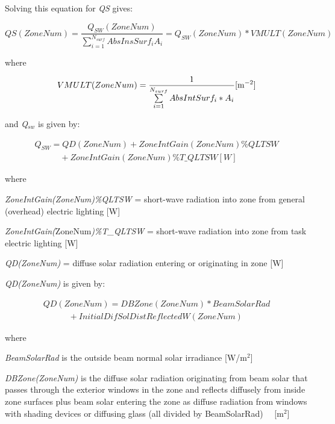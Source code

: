 Solving this equation for \emph{QS} gives:

\begin{equation}
QS(ZoneNum) = \frac{{{Q_{SW}}(ZoneNum)}}{{\sum\limits_{i = 1}^{{N_{surf}}} {AbsInsSur{f_i}{A_i}} }} = {Q_{SW}}(ZoneNum)*VMULT(ZoneNum)
\end{equation}

where

\begin{equation}
VMULT(ZoneNum) = \frac{1}{{\sum\limits_{i = 1}^{{N_{surf}}} {AbsIntSur{f_i}*{A_i}} }}{\rm{    [}}{{\rm{m}}^{{\rm{ - 2}}}}]
\end{equation}

and \emph{Q\(_{sw}\)} is given by:

\begin{equation}
\begin{array}{l}
{Q_{SW}} = QD(ZoneNum) + ZoneIntGain(ZoneNum)\% QLTSW \\
\quad \quad \quad + ZoneIntGain(ZoneNum)\% T\_QLTSW [W]
\end{array}
\end{equation}

where

\emph{ZoneIntGain(ZoneNum)\%QLTSW} = short-wave radiation into zone from general (overhead) electric lighting {[}W{]}

\emph{ZoneIntGain(}ZoneNum\emph{)\%T\_QLTSW} = short-wave radiation into zone from task electric lighting {[}W{]}

\emph{QD(ZoneNum)} = diffuse solar radiation entering or originating in zone {[}W{]}

\emph{QD(ZoneNum)} is given by:

\begin{equation}
\begin{array}{l}
QD(ZoneNum) = DBZone(ZoneNum)*BeamSolarRad \\
\quad \quad \quad + InitialDifSolDistReflectedW(ZoneNum)
\end{array}
\end{equation}

where

\emph{BeamSolarRad} is the outside beam normal solar irradiance {[}W/m\(^{2}\){]}

\emph{DBZone(ZoneNum)} is the diffuse solar radiation originating from beam solar that passes through the exterior windows in the zone and reflects diffusely from inside zone surfaces plus beam solar entering the zone as diffuse radiation from windows with shading devices or diffusing glass (all divided by BeamSolarRad)~~ {[}m\(^{2}\){]}

